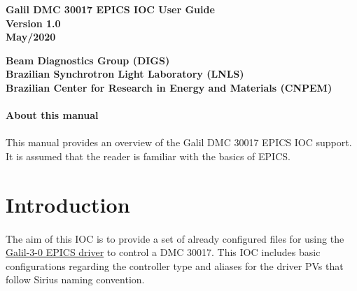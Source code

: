 \documentclass[openany]{article}
\begin{document}
\begin{titlepage}

\thispagestyle{fancy}

\begin{center}

\vspace*{\fill}
\textbf{\Huge Galil DMC 30017 EPICS IOC User Guide}\\[20pt]
\textbf{\Huge Version 1.0}\\[20pt]
\textbf{\Huge May/2020}
\vspace*{\fill}

\vfill
\textbf{Beam Diagnostics Group (DIGS)}\\[5pt]
\textbf{Brazilian Synchrotron Light Laboratory (LNLS)}\\[5pt]
\textbf{Brazilian Center for Research in Energy and Materials (CNPEM)}
\end{center}

\end{titlepage}

\newpage
\pagestyle{plain} %

\paragraph{}{\Large\bfseries About this manual}

\paragraph{} This manual provides an overview of the Galil DMC 30017 EPICS IOC support. It is assumed that the reader is familiar with the basics of EPICS.

\tableofcontents

\newpage
\section{Introduction}

\paragraph{} The aim of this IOC is to provide a set of already configured files for using the \href{https://github.com/motorapp/Galil-3-0}{Galil-3-0 EPICS driver} to control a DMC 30017. This IOC includes basic configurations regarding the controller type and aliases for the driver PVs that follow Sirius naming convention.
\end{document}
